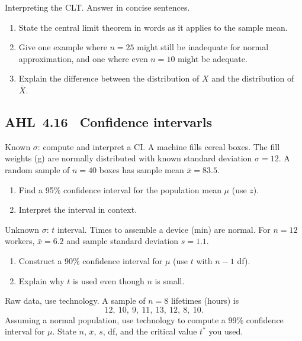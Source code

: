 \documentclass[11pt]{article}
\def\textbf#1{#1}%
\newcommand{\tocsubsection}[1]{\subsection{#1}}
\newcounter{question}
\begin{document}
\begin{question}
\textbf{Interpreting the CLT.}
Answer in concise sentences.
\begin{enumerate}
  \item State the central limit theorem in words as it applies to the sample mean.
  \item Give one example where $n=25$ might still be inadequate for normal approximation, and one where even $n=10$ might be adequate.
  \item Explain the difference between the distribution of $X$ and the distribution of $\bar X$.
\end{enumerate}
\end{question}


\tocsubsection{AHL 4.16 \; Confidence intervarls}


\begin{question}
\textbf{Known $\sigma$: compute and interpret a CI.}
A machine fills cereal boxes. The fill weights (g) are normally distributed with known standard deviation $\sigma=12$. 
A random sample of $n=40$ boxes has sample mean $\bar x=83.5$.
\begin{enumerate}
  \item Find a 95\% confidence interval for the population mean $\mu$ (use $z$).
  \item Interpret the interval in context.
\end{enumerate}
\end{question}

\begin{question}
\textbf{Unknown $\sigma$: $t$ interval.}
Times to assemble a device (min) are normal. For $n=12$ workers, $\bar x=6.2$ and sample standard deviation $s=1.1$.
\begin{enumerate}
  \item Construct a 90\% confidence interval for $\mu$ (use $t$ with $n-1$ df).
  \item Explain why $t$ is used even though $n$ is small.
\end{enumerate}
\end{question}

\begin{question}
\textbf{Raw data, use technology.}
A sample of $n=8$ lifetimes (hours) is
\[
12,\ 10,\ 9,\ 11,\ 13,\ 12,\ 8,\ 10.
\]
Assuming a normal population, use technology to compute a 99\% confidence interval for $\mu$. 
State $n$, $\bar{x}$, $s$, df, and the critical value $t^\ast$ you used.
\end{question}
\end{document}
